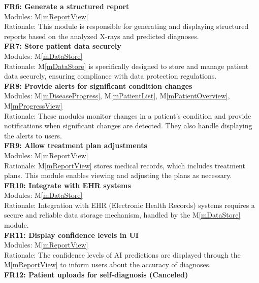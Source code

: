 \documentclass[12pt, titlepage]{article}
\newcommand{\mref}[1]{M\ref{#1}}
\begin{document}
\newline
\textbf{FR6: Generate a structured report} \\
Modules: \mref{mReportView} \\
Rationale: This module is responsible for generating and displaying structured reports based on the analyzed X-rays and predicted diagnoses. \\
\newline
\textbf{FR7: Store patient data securely} \\
Modules: \mref{mDataStore} \\
Rationale: \mref{mDataStore} is specifically designed to store and manage patient data securely, ensuring compliance with data protection regulations. \\
\newline
\textbf{FR8: Provide alerts for significant condition changes} \\
Modules: \mref{mDiseaseProgress}, \mref{mPatientList}, \mref{mPatientOverview}, \mref{mProgressView} \\
Rationale: These modules monitor changes in a patient's condition and provide notifications when significant changes are detected. They also handle displaying the alerts to users. \\
\newline
\textbf{FR9: Allow treatment plan adjustments} \\
Modules: \mref{mReportView} \\
Rationale: \mref{mReportView} stores medical records, which includes treatment plans. This module enables viewing and adjusting the plans as necessary. \\
\newline
\textbf{FR10: Integrate with EHR systems} \\
Modules: \mref{mDataStore} \\
Rationale: Integration with EHR (Electronic Health Records) systems requires a secure and reliable data storage mechanism, handled by the \mref{mDataStore} module. \\
\newline
\textbf{FR11: Display confidence levels in UI} \\
Modules: \mref{mReportView} \\
Rationale: The confidence levels of AI predictions are displayed through the \mref{mReportView} to inform users about the accuracy of diagnoses. \\
\newline
\textbf{FR12: Patient uploads for self-diagnosis (Canceled)} \\
\end{document}
